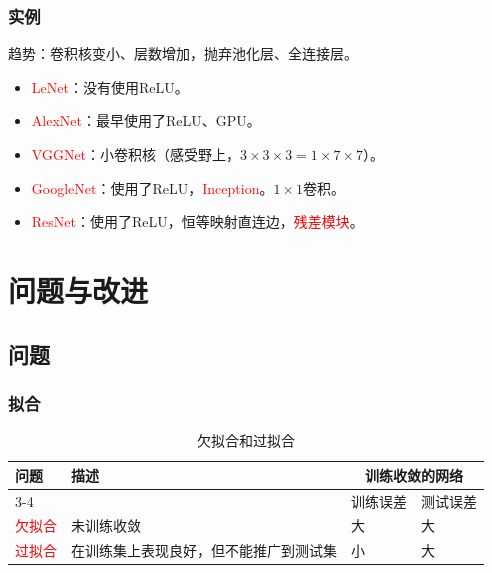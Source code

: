 \documentclass[
12pt, %
a4paper, 
oneside, %
]{scrartcl}
\begin{document}
\subsubsection[实例]{实例}
趋势：卷积核变小、层数增加，抛弃池化层、全连接层。
\begin{itemize}
\item \textcolor{red}{LeNet}：没有使用ReLU。
\item \textcolor{red}{AlexNet}：最早使用了ReLU、GPU。
\item \textcolor{red}{VGGNet}：小卷积核（感受野上，$ 3 \times 3 \times 3  = 1 \times 7 \times 7 $）。
\item \textcolor{red}{GoogleNet}：使用了ReLU，\textcolor{red}{Inception}。$ 1 \times 1 $卷积。
\item \textcolor{red}{ResNet}：使用了ReLU，恒等映射直连边，\textcolor{red}{残差模块}。
\end{itemize}
\section[问题与改进]{问题与改进}
\subsection[问题]{问题}
\subsubsection[拟合]{拟合}
\begin{table}[H]
\centering
\begin{tabular}{|p{1.5cm}|p{8.5cm}|p{2cm}|p{2cm}|}
\hline
问题 & 描述 & \multicolumn{2}{|c|}{训练收敛的网络} \\
\cline{3-4}
 & & 训练误差 & 测试误差 \\
\hline
\textcolor{red}{欠拟合} & 未训练收敛 & 大 & 大 \\
\hline
\textcolor{red}{过拟合} & 在训练集上表现良好，但不能推广到测试集 & 小 & 大 \\
\hline
\end{tabular}
\caption{欠拟合和过拟合}
\end{table}
\end{document}
